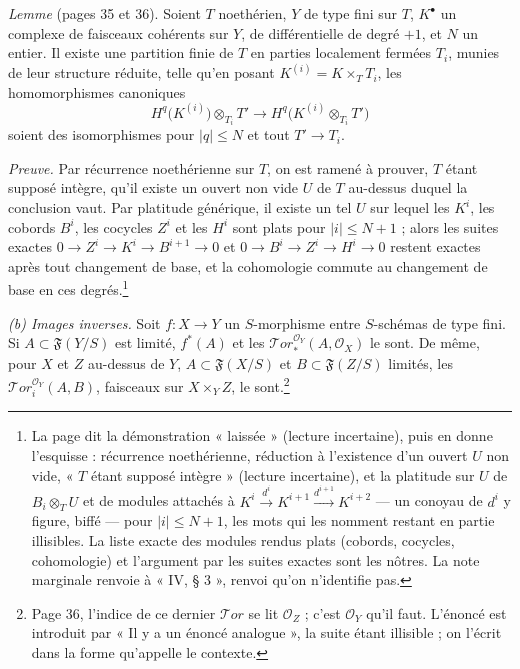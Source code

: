 \documentclass[11pt,a4paper]{article}
\begin{document}
\emph{Lemme} (pages 35 et 36). Soient $T$ noethérien, $Y$ de type fini sur
$T$, $K^{\bullet}$ un complexe de faisceaux cohérents sur $Y$, de
différentielle de degré $+1$, et $N$ un entier. Il existe une partition
finie de $T$ en parties localement fermées $T_i$, munies de leur structure
réduite, telle qu'en posant $K^{(i)} = K \times_T T_i$, les homomorphismes
canoniques
\[
  H^{q}\bigl(K^{(i)}\bigr) \otimes_{T_i} T' \longrightarrow
  H^{q}\bigl(K^{(i)} \otimes_{T_i} T'\bigr)
\]
soient des isomorphismes pour $|q| \leq N$ et tout $T' \to T_i$.

\emph{Preuve.} Par récurrence noethérienne sur $T$, on est ramené à
prouver, $T$ étant supposé intègre, qu'il existe un ouvert non vide $U$ de
$T$ au-dessus duquel la conclusion vaut. Par platitude générique, il existe
un tel $U$ sur lequel les $K^{i}$, les cobords $B^{i}$, les cocycles $Z^{i}$
et les $H^{i}$ sont plats pour $|i| \leq N + 1$ ; alors les suites exactes
$0 \to Z^{i} \to K^{i} \to B^{i+1} \to 0$ et $0 \to B^{i} \to Z^{i} \to
H^{i} \to 0$ restent exactes après tout changement de base, et la
cohomologie commute au changement de base en ces degrés.\footnote{La page
dit la démonstration « laissée » (lecture incertaine), puis en donne
l'esquisse : récurrence noethérienne, réduction à l'existence d'un ouvert
$U$ non vide, « $T$ étant supposé intègre » (lecture incertaine), et la
platitude sur $U$ de $B_i \otimes_T U$ et de modules attachés à
$K^{i} \xrightarrow{d^{i}} K^{i+1} \xrightarrow{d^{i+1}} K^{i+2}$ --- un
conoyau de $d^{i}$ y figure, biffé --- pour $|i| \leq N + 1$, les mots qui
les nomment restant en partie illisibles. La liste exacte des modules
rendus plats (cobords, cocycles, cohomologie) et l'argument par les suites
exactes sont les nôtres. La note marginale renvoie à « IV, § 3 », renvoi
qu'on n'identifie pas.}

\emph{(b) Images inverses.} Soit $f : X \to Y$ un $S$-morphisme entre
$S$-schémas de type fini. Si $A \subset \mathfrak{F}(Y/S)$ est limité,
$f^{*}(A)$ et les $\mathcal{T}or^{\mathcal{O}_Y}_{*}(A, \mathcal{O}_X)$ le
sont. De même, pour $X$ et $Z$ au-dessus de $Y$,
$A \subset \mathfrak{F}(X/S)$ et $B \subset \mathfrak{F}(Z/S)$ limités, les
$\mathcal{T}or^{\mathcal{O}_Y}_{i}(A, B)$, faisceaux sur $X \times_Y Z$, le
sont.\footnote{Page 36, l'indice de ce dernier $\mathcal{T}or$ se lit
$\mathcal{O}_Z$ ; c'est $\mathcal{O}_Y$ qu'il faut. L'énoncé est
introduit par « Il y a un énoncé analogue », la suite étant illisible ; on
l'écrit dans la forme qu'appelle le contexte.}
\end{document}
